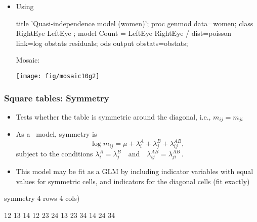 \begin{frame}[fragile]
	\begin{itemize}
			\item Using 
\vspace{1ex}
\begin{Input}[fontsize=\small,label=\fbox{$\cdots$ \texttt{mosaic10g.sas}},baselinestretch=0.7]
title 'Quasi-independence model (women)';
proc genmod data=women;
    class RightEye LeftEye ;
    model Count = LeftEye RightEye  /
        dist=poisson link=log obstats residuals;
    ods output obstats=obstats;
\end{Input}
Mosaic: 
\begin{center}
  \texttt{[image: fig/mosaic10g2]}
\end{center}

	\end{itemize} 

\end{frame}

\begin{frame}[fragile]
 \frametitle{Square tables: Symmetry}
		\begin{itemize}
		\item Tests whether the table is symmetric around the diagonal, i.e., $m_{ij} = m_{ji}$
		\item As a \loglin\ model, symmetry is  
	\begin{equation*}%
	 	\log m_{ij} = \mu + \lambda_i^A + \lambda_j^B + \lambda_{ij}^{AB} \comma
	\end{equation*}
	subject to the conditions
	\(
	 	\lambda_i^A = \lambda_j^B \quad\mbox{and}\quad \lambda_{ij}^{AB} = \lambda_{ji}^{AB} \period
	\)
	
			\item This model may be fit as a GLM by including \alert{indicator variables} with equal values
			for symmetric cells, and indicators for the diagonal cells (fit exactly)
		\end{itemize}
\vspace{2ex}
\begin{Output}[gobble=9,baselinestretch=0.85]
                 symmetry      4 rows      4 cols)

                                    12        13        14
                           12                 23        24
                           13        23                 34
                           14        24        34         
\end{Output}

\end{frame}

